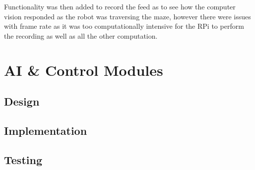 Functionality was then added to record the feed as to see how the computer vision responded as the robot was traversing the maze, however there were issues with frame rate as it was too computationally intensive for the RPi to perform the recording as well as all the other computation. 

\section{AI \& Control Modules}\label{soft/ai}

\subsection{Design}\label{soft/ai/design}

\subsection{Implementation}\label{soft/ai/impl}

\subsection{Testing}\label{soft/ai/test}
